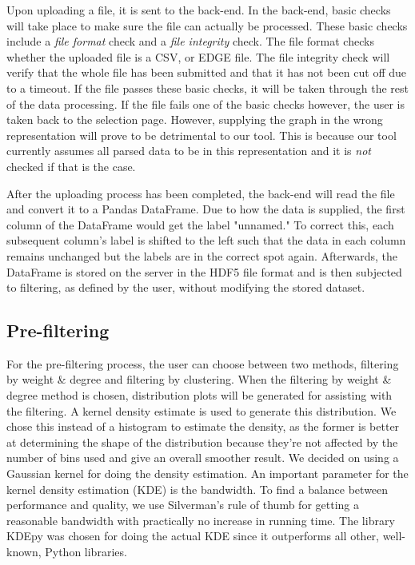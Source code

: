 \documentclass[journal]{vgtc}                %
\begin{document}
Upon uploading a file, it is sent to the back-end. In the back-end, basic checks will take place to make sure the file can actually be processed. These basic checks include a \textit{file format} check and a \textit{file integrity} check. The file format checks whether the uploaded file is a CSV, or EDGE file. The file integrity check will verify that the whole file has been submitted and that it has not been cut off due to a timeout. If the file passes these basic checks, it will be taken through the rest of the data processing. If the file fails one of the basic checks however, the user is taken back to the selection page. However, supplying the graph in the wrong representation will prove to be detrimental to our tool. This is because our tool currently assumes all parsed data to be in this representation and it is \textit{not} checked if that is the case.

After the uploading process has been completed, the back-end will read the file and convert it to a Pandas DataFrame. Due to how the data is supplied, the first column of the DataFrame would get the label "unnamed." To correct this, each subsequent column's label is shifted to the left such that the data in each column remains unchanged but the labels are in the correct spot again. Afterwards, the DataFrame is stored on the server in the HDF5 file format and is then subjected to filtering, as defined by the user, without modifying the stored dataset.
\subsection{Pre-filtering} \label{sect:prefiltering} %
For the pre-filtering process, the user can choose between two methods, filtering by weight \& degree and filtering by clustering.%
When the filtering by weight \&  degree method is chosen, distribution plots will be generated for assisting with the filtering. A kernel density estimate is used to generate this distribution. We chose this instead of a histogram to estimate the density, as the former is better at determining the shape of the distribution because they're not affected by the number of bins used and give an overall smoother result. We decided on using a Gaussian kernel for doing the density estimation. An important parameter for the kernel density estimation (KDE) is the bandwidth. To find a balance between performance and quality, we use Silverman's rule of thumb for getting a reasonable bandwidth with practically no increase in running time. The library KDEpy was chosen for doing the actual KDE since it outperforms all other, well-known, Python libraries.
\end{document}
